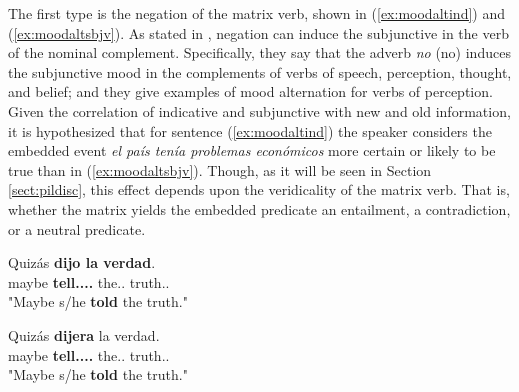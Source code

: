 The first type is the negation of the matrix verb, shown in (\ref{ex:moodaltind}) and (\ref{ex:moodaltsbjv}). As stated in \citet{espanola2010nueva}, negation can induce the subjunctive in the verb of the nominal complement. Specifically, they say that the adverb \textit{no} (no) induces the subjunctive mood in the complements of verbs of speech, perception, thought, and belief; and they give examples of mood alternation for verbs of perception. Given the correlation of indicative and subjunctive with new and old information, it is hypothesized that for sentence (\ref{ex:moodaltind}) the speaker considers the embedded event \textit{el país tenía problemas económicos} more certain or likely to be true than in (\ref{ex:moodaltsbjv}). Though, as it will be seen in Section \ref{sect:pildisc}, this effect depends upon the veridicality of the matrix verb. That is, whether the matrix yields the embedded predicate an entailment, a contradiction, or a neutral predicate.\\

\begin{exe}
  \ex
    \begin{xlist}
      \item{\gll Quizás \textbf{dijo la verdad}. \\ maybe \textbf{tell.\Pst.\Pfv.\Ind.\Tsg{}} the.\F.\Sg{} truth.\F.\Sg{} \\ "Maybe s/he \textbf{told} the truth."}\label{ex:moodaltindadv1}
      \item{\gll Quizás \textbf{dijera} la verdad.\\ maybe \textbf{tell.\Pst.\Pfv.\Sbjv.\Tsg{}} the.\F.\Sg{} truth.\F.\Sg{} \\ "Maybe s/he \textbf{told} the truth."}\label{ex:moodaltsbjvadv1}
    \end{xlist}
\end{exe}

